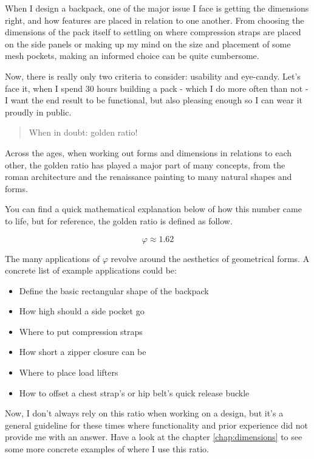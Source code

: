 When I design a backpack, one of the major issue I face is getting the dimensions right, and how features are placed in relation to one another. From choosing the dimensions of the pack itself to settling on where compression straps are placed on the side panels or making up my mind on the size and placement of some mesh pockets, making an informed choice can be quite cumbersome.

Now, there is really only two criteria to consider: usability and eye-candy. Let's face it, when I spend 30 hours building a pack - which I do more often than not - I want the end result to be functional, but also pleasing enough so I can wear it proudly in public.

\begin{quote}
  When in doubt: golden ratio!
\end{quote}

Across the ages, when working out forms and dimensions in relations to each other, the golden ratio has played a major part of many concepts, from the roman architecture and the renaissance painting to many natural shapes and forms.

You can find a quick mathematical explanation below of how this number came to life, but for reference, the golden ratio is defined as follow.

\begin{equation}
  \varphi \approx 1.62
\end{equation}

The many applications of $\varphi$ revolve around the aesthetics of geometrical forms. A concrete list of example applications could be:

\begin{itemize}
  \item Define the basic rectangular shape of the backpack
  \item How high should a side pocket go
  \item Where to put compression straps
  \item How short a zipper closure can be
  \item Where to place load lifters
  \item How to offset a chest strap's or hip belt's quick release buckle
\end{itemize}

Now, I don't always rely on this ratio when working on a design, but it's a general guideline for these times where functionality and prior experience did not provide me with an answer. Have a look at the chapter \ref{chap:dimensions} to see some more concrete examples of where I use this ratio.

